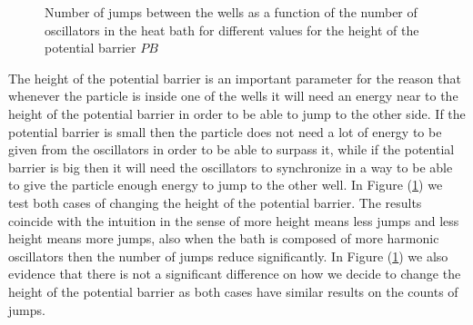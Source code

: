 \begin{figure}[H]%
    \centering
    \qquad
    \caption{Number of jumps between the wells as a function of the number of oscillators in the heat bath for different values for the height of the potential barrier $PB$}%
    \label{fig:changing_PB}%
\end{figure}

The height of the potential barrier is an important parameter for the reason that whenever the particle is inside one of the wells it will need an energy near to the height of the potential barrier in order to be able to jump to the other side. If the potential barrier is small then the particle does not need a lot of energy to be given from the oscillators in order to be able to surpass it, while if the potential barrier is big then it will need the oscillators to synchronize in a way to be able to give the particle enough energy to jump to the other well. In Figure (\ref{fig:changing_PB}) we test both cases of changing the height of the potential barrier. The results coincide with the intuition in the sense of more height means less jumps and less height means more jumps, also when the bath is composed of more harmonic oscillators then the number of jumps reduce significantly. In Figure (\ref{fig:changing_PB}) we also evidence that there is not a significant difference on how we decide to change the height of the potential barrier as both cases have similar results on the counts of jumps.






